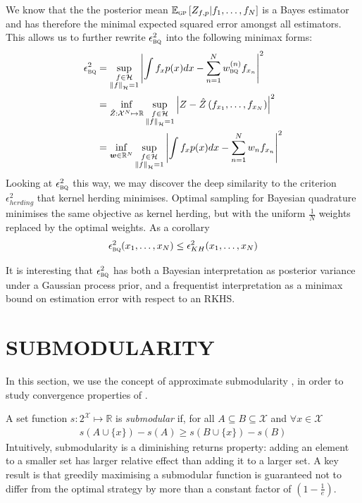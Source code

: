 \documentclass[]{article}
\begin{document}
We know that the the posterior mean $\mathbb{E}_{{\textsc{gp}}} \left[ {Z_{f,p}\vert f_1,\ldots,f_N} \right]$ is a Bayes estimator and has therefore the minimal expected squared error amongst all estimators. This allows us to further rewrite $\epsilon^{2}_{{\textsc{bq}}{}}$ into the following minimax forms:
%
\begin{align}
\epsilon^{2}_{{\textsc{bq}}{}} &= \sup_{\substack{f\in\mathcal{H}\\\left\|f\right\|_{\mathcal{H}}=1}} \left| \int f_x p(x) dx - \sum_{n=1}^{N}w^{(n)}_{{\textsc{bq}}{}} f_{x_n}\right|^2\\
	&= \inf_{\hat{Z}:\mathcal{X}^N\mapsto\mathbb{R}} \sup_{\substack{f\in\mathcal{H}\\\left\|f\right\|_{\mathcal{H}}=1}} \left| Z - \hat{Z}\left(f_{x_1},\ldots,f_{x_N}\right)\right|^2\\
	&= \inf_{\bm{w}\in\mathbb{R}^N} \sup_{\substack{f\in\mathcal{H}\\\left\|f\right\|_{\mathcal{H}}=1}} \left| \int f_x p(x) dx - \sum_{n=1}^{N}w_n 	f_{x_n}\right|^2
\end{align}
%
Looking at $\epsilon^{2}_{{\textsc{bq}}{}}$  this way, we may discover the deep similarity to the criterion $\epsilon^2_{herding}$ that kernel herding minimises. Optimal sampling for Bayesian quadrature minimises the same objective as kernel herding, but with the uniform $\frac{1}{N}$ weights replaced by the optimal weights. As a corollary
%
\begin{align}
\epsilon^{2}_{{\textsc{bq}}{}}(x_1,\ldots,x_N)  \leq \epsilon^{2}_{KH} (x_1,\ldots,x_N)
\end{align}

It is interesting that $\epsilon^{2}_{{\textsc{bq}}{}}$ has both a Bayesian interpretation as posterior variance under a Gaussian process prior, and a frequentist interpretation as a minimax bound on estimation error with respect to an RKHS.

\section{SUBMODULARITY}

\label{sec:submodularity}

In this section, we use the concept of approximate submodularity \citep{KrauseCevher10}, in order to study convergence properties of \sbq{}.

A set function $s:2^\mathcal{X} \mapsto \mathbb{R}$ is \textit{submodular} if, for all $A\subseteq B\subseteq \mathcal{X}$ and $\forall x \in \mathcal{X}$
%
\begin{align}
s(A\cup\{x\})-s(A)\geq s(B\cup\{x\})-s(B)
\end{align}
%
Intuitively, submodularity is a diminishing returns property: adding an element to a smaller set has larger relative effect than adding it to a larger set. A key result \cite[see e.\,g.\ ][and references therein]{KrauseCevher10} is that greedily maximising a submodular function is guaranteed not to differ from the optimal strategy by more than a constant factor of $(1-\frac{1}{e})$.
\end{document}
